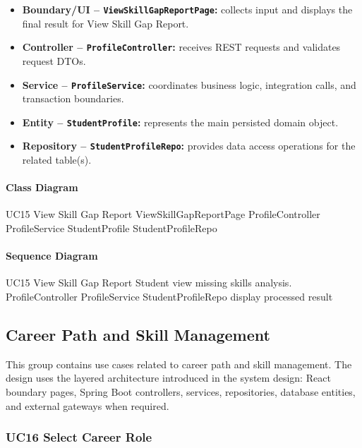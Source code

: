 \begin{itemize}
    \item \textbf{Boundary/UI -- \texttt{ViewSkillGapReportPage}:} collects input and displays the final result for View Skill Gap Report.
    \item \textbf{Controller -- \texttt{ProfileController}:} receives REST requests and validates request DTOs.
    \item \textbf{Service -- \texttt{ProfileService}:} coordinates business logic, integration calls, and transaction boundaries.
    \item \textbf{Entity -- \texttt{StudentProfile}:} represents the main persisted domain object.
    \item \textbf{Repository -- \texttt{StudentProfileRepo}:} provides data access operations for the related table(s).
\end{itemize}

\paragraph{Class Diagram}

\ClassDiagram
{UC15 View Skill Gap Report}
{ViewSkillGapReportPage}
{ProfileController}
{ProfileService}
{StudentProfile}
{StudentProfileRepo}

\paragraph{Sequence Diagram}

\SequenceDiagram
{UC15 View Skill Gap Report}
{Student}
{view missing skills analysis.}
{ProfileController}
{ProfileService}
{StudentProfileRepo}
{display processed result}

\subsection{Career Path and Skill Management}

This group contains use cases related to career path and skill management. The design uses the layered architecture introduced in the system design: React boundary pages, Spring Boot controllers, services, repositories, database entities, and external gateways when required.

\subsubsection{UC16 Select Career Role}

